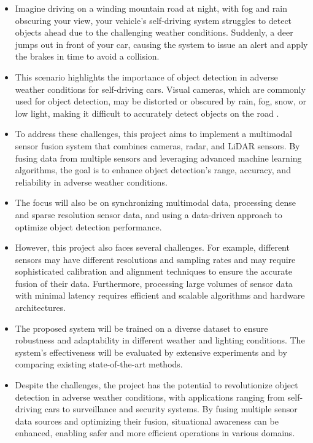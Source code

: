 \documentclass[rnd]{mas_proposal}
\begin{document}
\begin{itemize}
    \item Imagine driving on a winding mountain road at night, with fog and rain obscuring your view, your vehicle's self-driving system struggles to detect objects ahead due to the challenging weather conditions. Suddenly, a deer jumps out in front of your car, causing the system to issue an alert and apply the brakes in time to avoid a collision.

    \item This scenario highlights the importance of object detection in adverse weather conditions for self-driving cars. Visual cameras, which are commonly used for object detection, may be distorted or obscured by rain, fog, snow, or low light, making it difficult to accurately detect objects on the road \cite{yurtsever2020survey} \cite{carballo2020libre} \cite{mcity2020}.

    \item To address these challenges, this project aims to implement a multimodal sensor fusion system that combines cameras, radar, and LiDAR sensors. By fusing data from multiple sensors and leveraging advanced machine learning algorithms, the goal is to enhance object detection's range, accuracy, and reliability in adverse weather conditions.

    \item The focus will also be on synchronizing multimodal data, processing dense and sparse resolution sensor data, and using a data-driven approach to optimize object detection performance.

    \item However, this project also faces several challenges. For example, different sensors may have different resolutions and sampling rates and may require sophisticated calibration and alignment techniques to ensure the accurate fusion of their data. Furthermore, processing large volumes of sensor data with minimal latency requires efficient and scalable algorithms and hardware architectures.

    \item The proposed system will be trained on a diverse dataset to ensure robustness and adaptability in different weather and lighting conditions. The system's effectiveness will be evaluated by extensive experiments and by comparing existing state-of-the-art methods.

    \item Despite the challenges, the project has the potential to revolutionize object detection in adverse weather conditions, with applications ranging from self-driving cars to surveillance and security systems. By fusing multiple sensor data sources and optimizing their fusion, situational awareness can be enhanced, enabling safer and more efficient operations in various domains.


\end{itemize}
\end{document}
